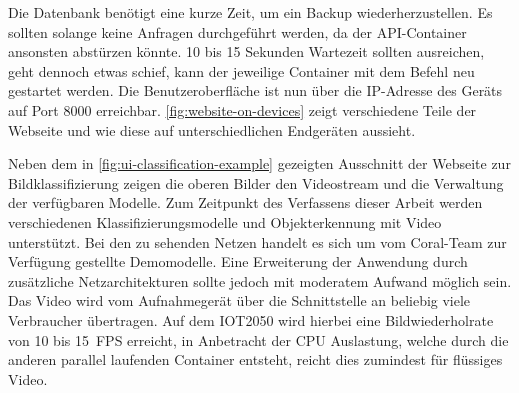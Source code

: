 Die Datenbank benötigt eine kurze Zeit,
um ein Backup wiederherzustellen.
Es sollten solange keine Anfragen durchgeführt werden,
da der API-Container ansonsten abstürzen könnte.
10 bis 15 Sekunden Wartezeit sollten ausreichen, geht dennoch etwas schief,
kann der jeweilige Container mit
dem Befehl  neu gestartet werden.
Die Benutzeroberfläche ist nun über die IP-Adresse des Geräts
auf Port 8000 erreichbar.
\autoref{fig:website-on-devices} zeigt verschiedene
Teile der Webseite und wie diese auf unterschiedlichen Endgeräten aussieht.
\newpage


\noindent
Neben dem in \autoref{fig:ui-classification-example} gezeigten
Ausschnitt der Webseite zur Bildklassifizierung zeigen die
oberen Bilder den Videostream und die Verwaltung der verfügbaren
Modelle. Zum Zeitpunkt des Verfassens dieser Arbeit werden
verschiedenen Klassifizierungsmodelle und Objekterkennung
mit Video unterstützt. Bei den zu sehenden Netzen
handelt es sich um vom Coral-Team zur Verfügung gestellte
Demomodelle. Eine Erweiterung der Anwendung
durch zusätzliche Netzarchitekturen sollte
jedoch mit moderatem Aufwand möglich sein.
Das Video wird vom Aufnahmegerät über die Schnittstelle
an beliebig viele Verbraucher übertragen.
Auf dem IOT2050 wird hierbei eine
Bildwiederholrate von 10 bis \qty{15}{FPS} erreicht,
in Anbetracht der CPU Auslastung, welche durch die anderen
parallel laufenden Container entsteht,
reicht dies zumindest für flüssiges Video.